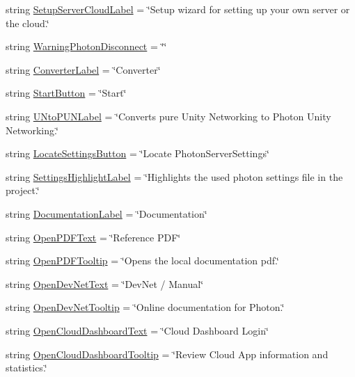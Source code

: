 \begin{DoxyCompactItemize}
\item 
string \hyperlink{class_pun_wizard_text_a9241c78a967abc0c2ec06a51d05c43a7}{Setup\+Server\+Cloud\+Label} = \char`\"{}Setup wizard for setting up your own server or the cloud.\char`\"{}
\item 
string \hyperlink{class_pun_wizard_text_a6e14ed66c0cf054099da066b0ff51cd3}{Warning\+Photon\+Disconnect} = \char`\"{}\char`\"{}
\item 
string \hyperlink{class_pun_wizard_text_abcf53e463461d4e0d0828d904f75fb13}{Converter\+Label} = \char`\"{}Converter\char`\"{}
\item 
string \hyperlink{class_pun_wizard_text_a69b56e0d631b99be36ca1fd0481c9af3}{Start\+Button} = \char`\"{}Start\char`\"{}
\item 
string \hyperlink{class_pun_wizard_text_a4b55e1319be8fbffe97ec49f0082a845}{U\+Nto\+P\+U\+N\+Label} = \char`\"{}Converts pure Unity Networking to Photon Unity Networking.\char`\"{}
\item 
string \hyperlink{class_pun_wizard_text_afac7dc3b8eb42ba802944f7ed7a0722f}{Locate\+Settings\+Button} = \char`\"{}Locate Photon\+Server\+Settings\char`\"{}
\item 
string \hyperlink{class_pun_wizard_text_a5dc1c06f3b528de9f8f0fc826b188141}{Settings\+Highlight\+Label} = \char`\"{}Highlights the used photon settings file in the project.\char`\"{}
\item 
string \hyperlink{class_pun_wizard_text_ae1dab9164063a1d996519de0d3c157d5}{Documentation\+Label} = \char`\"{}Documentation\char`\"{}
\item 
string \hyperlink{class_pun_wizard_text_aed4fa569a6a67715a4e87c1a9479c5e5}{Open\+P\+D\+F\+Text} = \char`\"{}Reference P\+DF\char`\"{}
\item 
string \hyperlink{class_pun_wizard_text_a6bc9aad5c97f25fad71f4bf7fea36a44}{Open\+P\+D\+F\+Tooltip} = \char`\"{}Opens the local documentation pdf.\char`\"{}
\item 
string \hyperlink{class_pun_wizard_text_a3e060bb7abfa48522c8acac07c86789f}{Open\+Dev\+Net\+Text} = \char`\"{}Dev\+Net / Manual\char`\"{}
\item 
string \hyperlink{class_pun_wizard_text_afc24da1439691f6ccce7508b7a477098}{Open\+Dev\+Net\+Tooltip} = \char`\"{}Online documentation for Photon.\char`\"{}
\item 
string \hyperlink{class_pun_wizard_text_a2c646651f0fc0c7f67b446c3c1c4e3d7}{Open\+Cloud\+Dashboard\+Text} = \char`\"{}Cloud Dashboard Login\char`\"{}
\item 
string \hyperlink{class_pun_wizard_text_a1b531189b2d2c2fe29b98a4591d5a5c0}{Open\+Cloud\+Dashboard\+Tooltip} = \char`\"{}Review Cloud App information and statistics.\char`\"{}

\end{DoxyCompactItemize}
